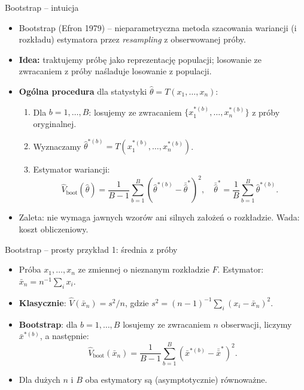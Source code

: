 \documentclass[10pt,ignorenonframetext, aspectratio=169]{beamer}
\begin{document}
\begin{frame}{Bootstrap -- intuicja}
\begin{itemize}
\justifying
    \item Bootstrap (Efron 1979) -- nieparametryczna metoda szacowania wariancji (i rozkładu) estymatora przez \emph{resampling} z obserwowanej próby.
    \item \textbf{Idea:} traktujemy próbę jako reprezentację populacji; losowanie ze zwracaniem z próby naśladuje losowanie z populacji.
    \item \textbf{Ogólna procedura} dla statystyki $\hat{\theta} = T(x_1, \ldots, x_n)$:
    \begin{enumerate}
        \item Dla $b = 1, \ldots, B$: losujemy ze zwracaniem $\{x_1^{*(b)}, \ldots, x_n^{*(b)}\}$ z próby oryginalnej.
        \item Wyznaczamy $\hat{\theta}^{*(b)} = T(x_1^{*(b)}, \ldots, x_n^{*(b)})$.
        \item Estymator wariancji:
        \begin{equation*}
            \hat{V}_{\text{boot}}(\hat{\theta}) = \frac{1}{B-1}\sum_{b=1}^{B}\left(\hat{\theta}^{*(b)} - \bar{\hat{\theta}}^*\right)^{\!2}, \quad \bar{\hat{\theta}}^* = \frac{1}{B}\sum_{b=1}^B \hat{\theta}^{*(b)}.
        \end{equation*}
    \end{enumerate}
    \item Zaleta: nie wymaga jawnych wzorów ani silnych założeń o rozkładzie. Wada: koszt obliczeniowy.
\end{itemize}
\end{frame}

\begin{frame}{Bootstrap -- prosty przykład 1: średnia z próby}
\begin{itemize}
\justifying
    \item Próba $x_1, \ldots, x_n$ ze zmiennej o nieznanym rozkładzie $F$. Estymator: $\bar{x}_n = n^{-1}\sum_i x_i$.
    \item \textbf{Klasycznie}: $\hat{V}(\bar{x}_n) = s^2/n$, gdzie $s^2 = (n-1)^{-1}\sum_i (x_i - \bar{x}_n)^2$.
    \item \textbf{Bootstrap}: dla $b = 1, \ldots, B$ losujemy ze zwracaniem $n$ obserwacji, liczymy $\bar{x}^{*(b)}$, a następnie:
    \begin{equation*}
        \hat{V}_{\text{boot}}(\bar{x}_n) = \frac{1}{B-1}\sum_{b=1}^{B}\left(\bar{x}^{*(b)} - \bar{\bar{x}}^*\right)^{\!2}.
    \end{equation*}
    \item Dla dużych $n$ i $B$ oba estymatory są (asymptotycznie) równoważne.
\end{itemize}
\end{frame}
\end{document}
